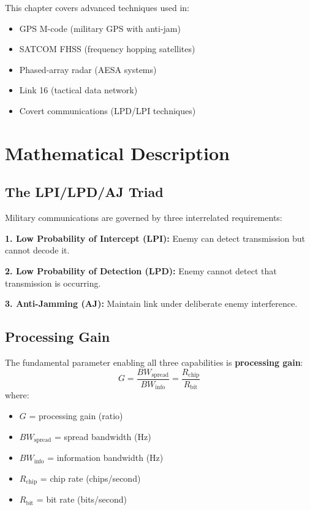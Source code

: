 This chapter covers advanced techniques used in:
\begin{itemize}
\item GPS M-code (military GPS with anti-jam)
\item SATCOM FHSS (frequency hopping satellites)
\item Phased-array radar (AESA systems)
\item Link 16 (tactical data network)
\item Covert communications (LPD/LPI techniques)
\end{itemize}

\section{Mathematical Description}

\subsection{The LPI/LPD/AJ Triad}

Military communications are governed by three interrelated requirements:

\textbf{1. Low Probability of Intercept (LPI):} Enemy can detect transmission but cannot decode it.

\textbf{2. Low Probability of Detection (LPD):} Enemy cannot detect that transmission is occurring.

\textbf{3. Anti-Jamming (AJ):} Maintain link under deliberate enemy interference.

\subsection{Processing Gain}

The fundamental parameter enabling all three capabilities is \textbf{processing gain}:
\begin{equation}
G = \frac{BW_{\text{spread}}}{BW_{\text{info}}} = \frac{R_{\text{chip}}}{R_{\text{bit}}}
\end{equation}
where:
\begin{itemize}
\item $G$ = processing gain (ratio)
\item $BW_{\text{spread}}$ = spread bandwidth (Hz)
\item $BW_{\text{info}}$ = information bandwidth (Hz)
\item $R_{\text{chip}}$ = chip rate (chips/second)
\item $R_{\text{bit}}$ = bit rate (bits/second)
\end{itemize}


